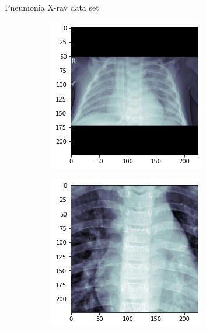 \begin{frame}{Pneumonia X-ray data set}
            \begin{figure}[htbp!]
     \centering
     \begin{subfigure}[b]{0.3\textwidth}
         \centering
         \includegraphics[width=\textwidth]{Images/xray_normal1.png}
     \end{subfigure} 
     \hfill
     \begin{subfigure}[b]{0.3\textwidth}
         \centering
         \includegraphics[width=\textwidth]{Images/xray_normal3.png}

\end{subfigure}
\end{figure}
\end{frame}
